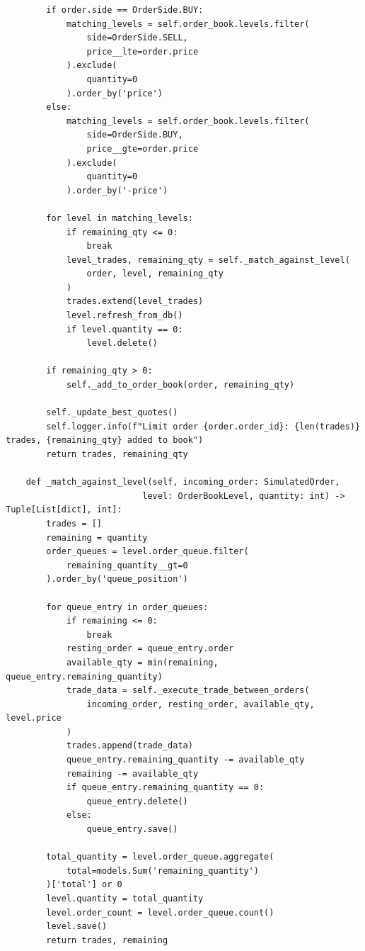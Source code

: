 \documentclass[12pt]{article}
\begin{document}
\begin{verbatim}
        if order.side == OrderSide.BUY:
            matching_levels = self.order_book.levels.filter(
                side=OrderSide.SELL,
                price__lte=order.price
            ).exclude(
                quantity=0
            ).order_by('price')
        else:
            matching_levels = self.order_book.levels.filter(
                side=OrderSide.BUY,
                price__gte=order.price
            ).exclude(
                quantity=0
            ).order_by('-price')

        for level in matching_levels:
            if remaining_qty <= 0:
                break
            level_trades, remaining_qty = self._match_against_level(
                order, level, remaining_qty
            )
            trades.extend(level_trades)
            level.refresh_from_db()
            if level.quantity == 0:
                level.delete()

        if remaining_qty > 0:
            self._add_to_order_book(order, remaining_qty)

        self._update_best_quotes()
        self.logger.info(f"Limit order {order.order_id}: {len(trades)} trades, {remaining_qty} added to book")
        return trades, remaining_qty

    def _match_against_level(self, incoming_order: SimulatedOrder,
                           level: OrderBookLevel, quantity: int) -> Tuple[List[dict], int]:
        trades = []
        remaining = quantity
        order_queues = level.order_queue.filter(
            remaining_quantity__gt=0
        ).order_by('queue_position')

        for queue_entry in order_queues:
            if remaining <= 0:
                break
            resting_order = queue_entry.order
            available_qty = min(remaining, queue_entry.remaining_quantity)
            trade_data = self._execute_trade_between_orders(
                incoming_order, resting_order, available_qty, level.price
            )
            trades.append(trade_data)
            queue_entry.remaining_quantity -= available_qty
            remaining -= available_qty
            if queue_entry.remaining_quantity == 0:
                queue_entry.delete()
            else:
                queue_entry.save()

        total_quantity = level.order_queue.aggregate(
            total=models.Sum('remaining_quantity')
        )['total'] or 0
        level.quantity = total_quantity
        level.order_count = level.order_queue.count()
        level.save()
        return trades, remaining


\end{verbatim}
\end{document}
